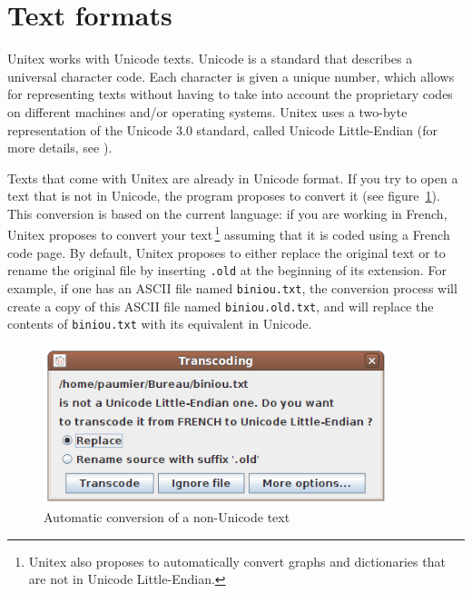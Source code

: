 \section{Text formats}
\label{section-conversion-texte-unicode}
Unitex works with Unicode texts. Unicode is a standard that describes a universal
character code. Each character is given a unique number, which allows for
representing texts without having to take into account  the proprietary codes on
different machines and/or operating systems. Unitex uses a two-byte
representation of the Unicode 3.0 standard, called Unicode Little-Endian (for
more details, see \cite{UNICODE}).

\bigskip
{}
\noindent Texts that come with Unitex are already in Unicode format. If you try
to open a text that is not in Unicode, the program proposes to convert it
(see figure~\ref{auto-transcoding}).
This conversion is based on the current language: if you are working in French,
Unitex proposes to convert your text\,\footnote{Unitex also proposes to
automatically convert graphs and dictionaries that are not in Unicode
Little-Endian.} assuming that it is coded using a French code page. By default,
Unitex proposes to either replace the original text or to rename the original
file by inserting \verb$.old$ at the beginning of  its extension. For example, if
one has an ASCII file named \verb$biniou.txt$, the conversion process will create
a copy of this ASCII file named \verb$biniou.old.txt$, and will replace the
contents of \verb$biniou.txt$ with its equivalent in Unicode.


\begin{figure}[!ht]
\begin{center}
\includegraphics[width=10cm]{resources/img/fig2-2.png}
\caption{\label{auto-transcoding}Automatic conversion of a non-Unicode text}
\end{center}
\end{figure}

